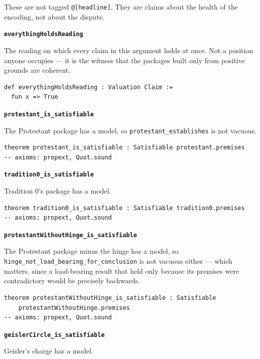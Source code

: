 \documentclass[11pt]{article}
\begin{document}
These are not tagged \texttt{@[headline]}. They are claims about the health of the encoding, not about the dispute.

\par\medskip\noindent\textbf{\texttt{everything\allowbreak{}Holds\allowbreak{}Reading}}\par\nobreak\noindent
The reading on which every claim in this argument holds at once. Not a position anyone occupies — it is the witness that the packages built only from positive grounds are coherent.

{\small\begin{verbatim}
def everythingHoldsReading : Valuation Claim :=
  fun x => True
\end{verbatim}}
\par\medskip\noindent\textbf{\texttt{protestant\_\allowbreak{}is\_\allowbreak{}satisfiable}}\par\nobreak\noindent
The Protestant package has a model, so \texttt{protestant\_\allowbreak{}establishes} is not vacuous.

{\small\begin{verbatim}
theorem protestant_is_satisfiable : Satisfiable protestant.premises
-- axioms: propext, Quot.sound
\end{verbatim}}
\par\medskip\noindent\textbf{\texttt{tradition0\_\allowbreak{}is\_\allowbreak{}satisfiable}}\par\nobreak\noindent
Tradition 0's package has a model.

{\small\begin{verbatim}
theorem tradition0_is_satisfiable : Satisfiable tradition0.premises
-- axioms: propext, Quot.sound
\end{verbatim}}
\par\medskip\noindent\textbf{\texttt{protestant\allowbreak{}Without\allowbreak{}Hinge\_\allowbreak{}is\_\allowbreak{}satisfiable}}\par\nobreak\noindent
The Protestant package minus the hinge has a model, so \texttt{hinge\_\allowbreak{}not\_\allowbreak{}load\_\allowbreak{}bearing\_\allowbreak{}for\_\allowbreak{}conclusion} is not vacuous either — which matters, since a load-bearing result that held only because its premises were contradictory would be precisely backwards.

{\small\begin{verbatim}
theorem protestantWithoutHinge_is_satisfiable : Satisfiable
    protestantWithoutHinge.premises
-- axioms: propext, Quot.sound
\end{verbatim}}
\par\medskip\noindent\textbf{\texttt{geisler\allowbreak{}Circle\_\allowbreak{}is\_\allowbreak{}satisfiable}}\par\nobreak\noindent
Geisler's charge has a model.
\end{document}
